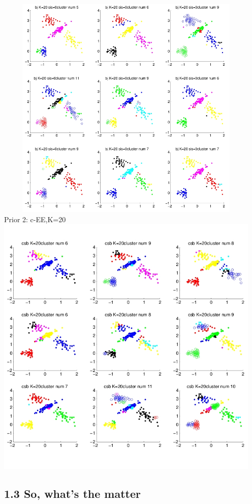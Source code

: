\documentclass{article}
\begin{document}
\begin{spacing}{1.1}
\begin{center}
\includegraphics[width=5in,height=4.25in]{1_ee_20.jpg} \\
Prior 2: c-EE,K=20\\
\includegraphics[width=5in,height=5in]{1_cee_20.jpg} \\

   \end{center}

\subsection{1.3 So, what's the matter}


\end{spacing}
\end{document}
